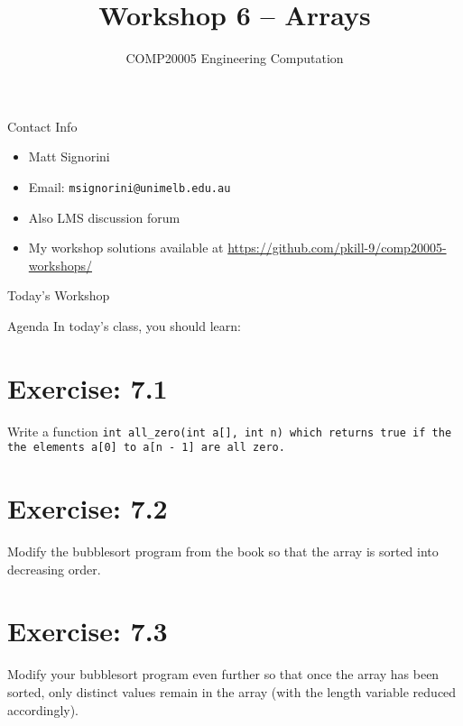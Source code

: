 \documentclass{beamer}
\title{Workshop 6 -- Arrays}
\author{COMP20005 Engineering Computation}
\institute{The University of Melbourne}
\begin{document}
\begin{frame}
    \titlepage
\end{frame}

\begin{frame}{Contact Info}
    \begin{itemize}
        \item Matt Signorini
        \item Email: \texttt{msignorini@unimelb.edu.au}
        \item Also LMS discussion forum
        \item My workshop solutions available at \url{https://github.com/pkill-9/comp20005-workshops/}
    \end{itemize}
\end{frame}

\begin{frame}{Today's Workshop}
    \begin{block}{Agenda}
        In today's class, you should learn:
        \begin{itemize}
        \end{itemize}
    \end{block}
\end{frame}

\section{Exercise: 7.1}

\begin{frame}{7.1}
    Write a function \tt{int all\_zero(int a[], int n)} which returns true
    if the the elements \tt{a[0]} to \tt{a[n - 1]} are all zero.
\end{frame}

\section{Exercise: 7.2}

\begin{frame}{7.2}
    Modify the bubblesort program from the book so that the array is sorted
    into decreasing order.
\end{frame}

\section{Exercise: 7.3}

\begin{frame}{7.3}
    Modify your bubblesort program even further so that once the array has
    been sorted, only distinct values remain in the array (with the length
    variable reduced accordingly).
\end{frame}
\end{document}
